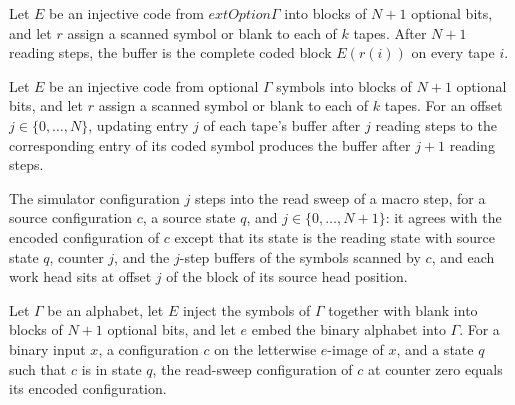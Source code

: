\begin{lemma}
\label{Turing.FinTM.arBuffer_full}
\leanok
{}
Let $E$ be an injective code from $	ext{Option }\Gamma$ into blocks of $N+1$
optional bits, and let $r$ assign a scanned symbol or blank to each of $k$ tapes. After
$N+1$ reading steps, the buffer is the complete coded block $E(r(i))$ on every tape $i$.
\end{lemma}

\begin{lemma}
\label{Turing.FinTM.arBuffer_update}
\leanok
{}
Let $E$ be an injective code from optional $\Gamma$ symbols into blocks of $N+1$
optional bits, and let $r$ assign a scanned symbol or blank to each of $k$ tapes. For an
offset $j\in\{0,\ldots,N\}$, updating entry $j$ of each tape's buffer after $j$ reading
steps to the corresponding entry of its coded symbol produces the buffer after $j+1$
reading steps.
\end{lemma}

\begin{definition}
\label{Turing.FinTM.arReadCfg}
\leanok
{}
The simulator configuration $j$ steps into the read sweep of a macro step, for a source
configuration $c$, a source state $q$, and $j \in \{0,\dots,N+1\}$: it agrees with the
encoded configuration of $c$ except that its state is the reading state with source
state $q$, counter $j$, and the $j$-step buffers of the symbols scanned by $c$, and
each work head sits at offset $j$ of the block of its source head position.
\end{definition}

\begin{lemma}
\label{Turing.FinTM.arReadCfg_zero}
\leanok
{}
Let $\Gamma$ be an alphabet, let $E$ inject the symbols of $\Gamma$ together with blank
into blocks of $N+1$ optional bits, and let $e$ embed the binary alphabet into $\Gamma$.
For a binary input $x$, a configuration $c$ on the letterwise $e$-image of $x$, and a
state $q$ such that $c$ is in state $q$, the read-sweep configuration of $c$ at counter
zero equals its encoded configuration.
\end{lemma}

